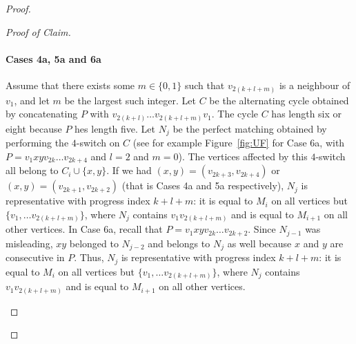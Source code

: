 \documentclass[11pt,a4paper]{article}
\theoremstyle{definition}
\newenvironment{poc}{\begin{proof}[Proof of
    Claim]\renewcommand*{\qedsymbol}{$\blacksquare$}}{\end{proof}}
\begin{document}
\begin{proof}
\begin{poc}
    \paragraph{Cases 4a, 5a and 6a} Assume that there exists some
    $m \in \{0,1\}$ such that $v_{2(k+l+m)}$ is a neighbour of $v_1$, and let
    $m$ be the largest such integer. Let $C$ be the alternating cycle obtained
    by concatenating $P$ with $v_{2(k+l)} \dots v_{2(k+l+m)}v_1$.  The cycle $C$
    has length six or eight because $P$ hes length five. Let $N_{j}$ be the
    perfect matching obtained by performing the $4$-switch on $C$ (see for example
    Figure~\ref{fig:UF} for Case 6a, with $P = v_1xyv_{2k}\dots v_{2k+4}$ and $l = 2$
    and $m=0$). The vertices affected by this $4$-switch all belong to
    $C_i \cup \{x,y\}$. If we had $(x,y) = (v_{2k+3}, v_{2k+4})$ or
    $(x,y) = (v_{2k+1}, v_{2k+2})$ (that is Cases 4a and 5a respectively), $N_j$
    is representative with progress index $k+l+m$: it is equal to $M_i$ on all
    vertices but $\{v_1, \dots v_{2(k+l+m)}\}$, where $N_j$ contains
    $v_1v_{2(k+l+m)}$ and is equal to $M_{i+1}$ on all other vertices. In Case
    6a, recall that $P = v_1xyv_{2k}\dots v_{2k+2}$. Since $N_{j-1}$ was
    misleading, $xy$ belonged to $N_{j-2}$ and belongs to $N_{j}$ as well
    because $x$ and $y$ are consecutive in $P$. Thus, $N_j$ is representative
    with progress index $k+l+m$: it is equal to $M_i$ on all vertices but
    $\{v_1, \dots v_{2(k+l+m)}\}$, where $N_j$ contains $v_1v_{2(k+l+m)}$ and is
    equal to $M_{i+1}$ on all other vertices.
       \begin{figure}[ht!]
      
      \centering
      \begin{subfigure}[t]{.45\linewidth}
        \centering
\end{subfigure}
\end{figure}
\end{poc}
\end{proof}
\end{document}

